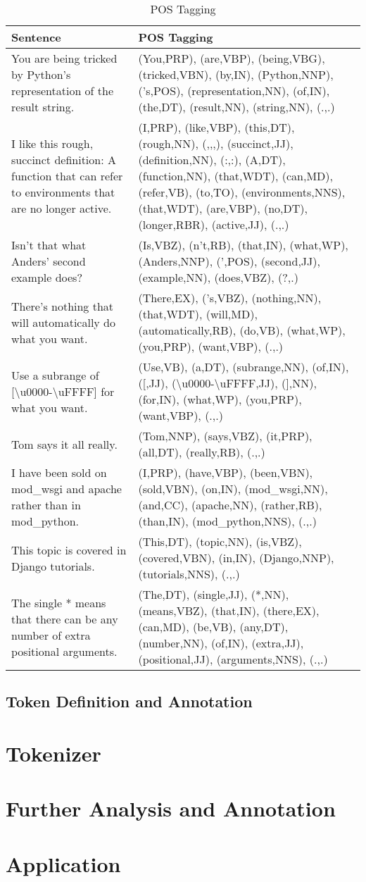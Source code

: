 \begin{table}
\caption{POS Tagging}
\begin{tabu}{X[1.15,l]X[2,l]}
    \textbf{Sentence} & \textbf{POS Tagging} \\
    \midrule
    You are being tricked by Python's representation of the result string.&
    (You,PRP), (are,VBP), (being,VBG), (tricked,VBN), (by,IN), (Python,NNP),
    ('s,POS), (representation,NN), (of,IN), (the,DT), (result,NN), 
    (string,NN), (.,.) \\
    I like this rough, succinct definition: A function that can refer to 
    environments that are no longer active.&
    (I,PRP), (like,VBP), (this,DT), (rough,NN), (,,,), (succinct,JJ),
    (definition,NN), (:,:), (A,DT), (function,NN), (that,WDT), (can,MD),
    (refer,VB), (to,TO), (environments,NNS), (that,WDT), (are,VBP), (no,DT),
    (longer,RBR), (active,JJ), (.,.) \\
    Isn't that what Anders' second example does? &
    (Is,VBZ), (n't,RB), (that,IN), (what,WP), (Anders,NNP), (',POS),
    (second,JJ), (example,NN), (does,VBZ), (?,.) \\
    There's nothing that will automatically do what you want. & 
    (There,EX), ('s,VBZ), (nothing,NN), (that,WDT), (will,MD),
    (automatically,RB), (do,VB), (what,WP), (you,PRP), (want,VBP), (.,.) \\
    Use a subrange of [\textbackslash{}u0000-\textbackslash{}uFFFF] for what
    you want. &
    (Use,VB), (a,DT), (subrange,NN), (of,IN), ([,JJ),
    (\textbackslash{}u0000-\textbackslash{}uFFFF,JJ), (],NN),
    (for,IN), (what,WP), (you,PRP), (want,VBP), (.,.) \\
    Tom says it all really. &
    (Tom,NNP), (says,VBZ), (it,PRP), (all,DT), (really,RB), (.,.) \\
    I have been sold on mod\_wsgi and apache rather than in mod\_python. &
    (I,PRP), (have,VBP), (been,VBN), (sold,VBN), (on,IN), (mod\_wsgi,NN),
    (and,CC), (apache,NN), (rather,RB), (than,IN), (mod\_python,NNS), (.,.) \\
    This topic is covered in Django tutorials. &
    (This,DT), (topic,NN), (is,VBZ), (covered,VBN), (in,IN), (Django,NNP),
    (tutorials,NNS), (.,.) \\
    The single * means that there can be any number of extra positional
    arguments. &
    (The,DT), (single,JJ), (*,NN), (means,VBZ), (that,IN), (there,EX), (can,MD),
    (be,VB), (any,DT), (number,NN), (of,IN), (extra,JJ), (positional,JJ),
    (arguments,NNS), (.,.) \\
\end{tabu} 
\end{table}

\subsection{Token Definition and Annotation}

\section{Tokenizer}

\section{Further Analysis and Annotation}

\section{Application}